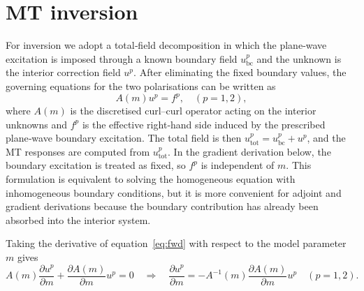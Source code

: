 \documentclass{article}
\begin{document}
\section{MT inversion}

For inversion we adopt a total‑field decomposition in which the plane‑wave excitation is imposed through a known boundary field $u_{\mathrm{bc}}^p$ and the unknown is the interior correction field $u^p$. After eliminating the fixed boundary values, the governing equations for the two polarisations can be written as
\begin{equation}\label{eq:fwd}
  A(m) u^{p}=  f^{p}, \quad (p=1,2),
\end{equation}
where $A(m)$ is the discretised curl–curl operator acting on the interior unknowns and $f^p$ is the effective right‑hand side induced by the prescribed plane‑wave boundary excitation. The total field is then $u_{\mathrm{tot}}^p=u_{\mathrm{bc}}^p+u^p$, and the MT responses are computed from $u_{\mathrm{tot}}^p$. In the gradient derivation below, the boundary excitation is treated as fixed, so $f^p$ is independent of $m$. This formulation is equivalent to solving the homogeneous equation with inhomogeneous boundary conditions, but it is more convenient for adjoint and gradient derivations because the boundary contribution has already been absorbed into the interior system.

Taking the derivative of equation~\eqref{eq:fwd} with respect to the model parameter $m$ gives
\begin{equation}
  A(m)\frac{\partial u^p}{\partial m} + \frac{\partial A(m)}{\partial m} u^p=0 \quad\Rightarrow\quad
  \frac{\partial u^p}{\partial m} = -A^{-1}(m)\frac{\partial A(m)}{\partial m}u^p \quad (p=1,2).
\end{equation}
\end{document}
